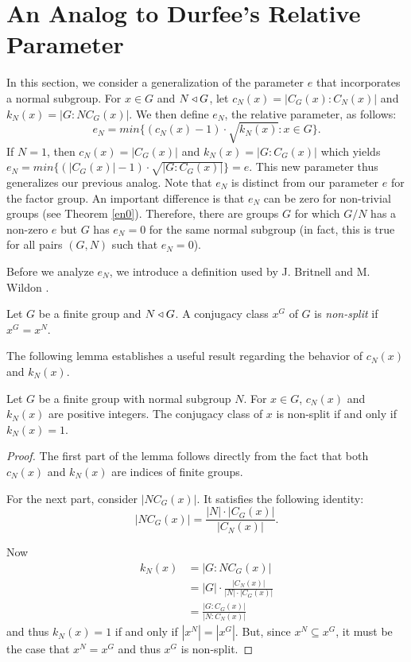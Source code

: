 \documentclass[main.tex]{subfiles}
\begin{document}
\chapter{An Analog to Durfee's Relative Parameter}

In this section, we consider a generalization of the parameter $e$ that incorporates a normal subgroup. For $x \in G$ and $N \triangleleft G$, let $c_N(x) = |C_G(x):C_N(x)|$ and $k_N(x) = |G:NC_G(x)|$. We then define $e_N$, the relative parameter, as follows:
$$e_N = min\{(c_N(x) - 1) \cdot \sqrt{k_N(x)} : x \in G\}\text{.}$$
If $N=1$, then $c_N(x) = |C_G(x)|$ and $k_N(x) = |G:C_G(x)|$ which yields $e_N = min\{(|C_G(x)| - 1)\cdot\sqrt{|G:C_G(x)|}\} = e$. This new parameter thus generalizes our previous analog. Note that $e_N$ is distinct from our parameter $e$ for the factor group. An important difference is that $e_N$ can be zero for non-trivial groups (see Theorem \ref{en0}). Therefore, there are groups $G$ for which $G/N$ has a non-zero $e$ but $G$ has $e_N = 0$ for the same normal subgroup (in fact, this is true for all pairs $(G, N)$ such that $e_N = 0$).



 Before we analyze $e_N$, we introduce a definition used by J. Britnell and M. Wildon \cite{britnellwildonarticle}.

\hss

\begin{definition}
Let $G$ be a finite group and $N \triangleleft G$. A conjugacy class $x^G$ of $G$ is \emph{non-split} if $x^G = x^N$.
\end{definition}

\hss

The following lemma establishes a useful result regarding the behavior of $c_N(x)$ and $k_N(x)$.

\begin{lemma}\label{kn1}
Let $G$ be a finite group with normal subgroup $N$. For $x \in G$, $c_N(x)$ and $k_N(x)$ are positive integers. The conjugacy class of $x$ is non-split if and only if $k_N(x) = 1$.
\end{lemma}

\begin{proof}
The first part of the lemma follows directly from the fact that both $c_N(x)$ and $k_N(x)$ are indices of finite groups.

For the next part, consider $|NC_G(x)|$. It satisfies the following identity:
$$|NC_G(x)| = \frac{|N| \cdot |C_G(x)|}{|C_N(x)|}\text{.}$$

Now
\begin{align*}
k_N(x) &= |G : NC_G(x)| \\
&= |G| \cdot \frac{|C_N(x)|}{|N| \cdot |C_G(x)|} \\
&= \frac{|G : C_G(x)|}{|N : C_N(x)|}
\end{align*}
and thus $k_N(x) = 1$ if and only if $|x^N| = |x^G|$. But, since $x^N \subseteq x^G$, it must be the case that $x^N = x^G$ and thus $x^G$ is non-split.
\end{proof}
\end{document}
